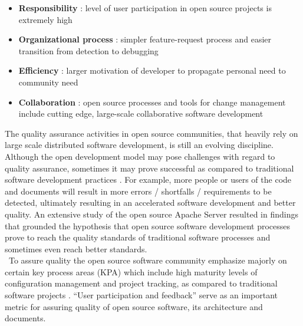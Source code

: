 \begin{itemize}
\item \textbf{Responsibility} : level of user participation in open source projects is extremely high
\item \textbf{Organizational process} : simpler feature-request process and easier transition from detection to debugging 
\item \textbf{Efficiency} : larger motivation of developer to propagate personal need to community need
\item \textbf{Collaboration} : open source processes and tools for change management include cutting edge, large-scale collaborative software development
\end{itemize}
\indent The quality assurance activities in open source communities, that heavily rely on large scale distributed software development, is still an evolving discipline. Although the open development model may pose challenges with regard to quality assurance, sometimes it may prove successful as compared to traditional software development practices \cite{Zhao2003}. For example, more people or users of the code and documents will result in more errors / shortfalls / requirements to be detected, ultimately resulting in an accelerated software development and better quality. An extensive study of the open source Apache Server \cite{Mockus2000} resulted in findings that grounded the hypothesis that open source software development processes prove to reach the quality standards of traditional software processes and sometimes even reach better standards.
\\\ To assure quality the open source software community emphasize majorly on certain key process areas (KPA) which include high maturity levels of configuration management and project tracking, as compared to traditional software projects \cite{Zhao2003}. \enquote{User participation and feedback} serve as an important metric for assuring quality of open source software, its architecture and documents. 


